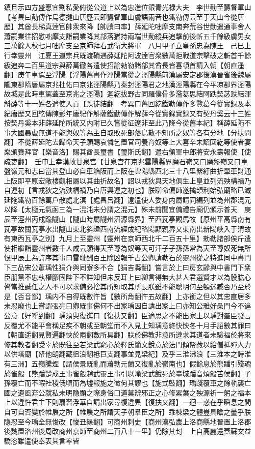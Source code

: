 鎮且示四方盛悳宜割私愛俯從公道上以為忠進位銀青光禄大夫　李世勣至欝督軍山　【考異曰勣傳作烏德揵山唐歷云即欝督軍山虜語兩音也鐵勒傳云至于天山今從唐歷】其酋長梯真逹官帥衆來降【帥讀曰率】薛延陀咄摩支南奔荒谷世勣遣通事舍人蕭嗣業往招慰咄摩支詣嗣業降其部落猶持兩端世勣縱兵追擊前後斬五千餘級虜男女三萬餘人秋七月咄摩支至京師拜右武衛大將軍　八月甲子立皇孫忠為陳王　己巳上行幸靈州　江夏王道宗兵既渡磧遇薛延陀阿波逹官衆數萬拒戰道宗擊破之斬首千餘級追奔二百里道宗與薛萬徹各遣使招諭勑勒諸部其酋長皆喜頓首請入朝【朝直遥翻】庚午車駕至浮陽【浮陽舊書作涇陽當從之涇陽縣前漢屬安定郡後漢晉省後魏屬隴東郡隋唐屬京兆杜佑曰京兆涇陽縣乃秦封涇陽君之地漢涇陽縣在今平凉郡界涇陽故城是此時車駕蓋至京兆之涇陽】迴紇拔野古同羅僕骨多濫葛思結阿跌契苾跌結渾斛薛等十一姓各遣使入貢【跌徒結翻　考異曰舊回紇鐵勒傳作多覽葛今從實録及本紀唐歷又回紇傳陳彭年唐紀作斛薩鐵勤傳作解薛今從實録實録又有契丹奚云十三姓按契丹奚本非薛延陀所統又内附已久嘗從征遼非至此乃降今從舊本紀】稱薛延陁不事大國暴虐無道不能與奴等為主自取敗死部落鳥散不知所之奴等各有分地【分扶問翻】不從薛延陀去歸命天子願賜哀憐乞置官司養育奴等上大喜辛未詔回紇等使者宴樂頒賚拜官【樂音洛】賜其酋長璽書【璽斯氏翻】遣右領軍中郎將安永壽報使【使疏吏翻】　壬申上幸漢故甘泉宫【甘泉宫在京兆雲陽縣界磨石嶺又曰磨盤嶺又曰車盤嶺元和志曰當其登山必自車箱阪而上阪在雲陽縣西北三十八里縈紆曲折單車財通上阪即平原宏敞樓觀相屬以其曲折故名】詔以戎狄與天地俱生上皇並列流殃構禍乃自運初【言戎狄之流殃構禍乃自唐興運之初也】朕聊命偏師遂擒頡利始弘廟略已滅延陁鐵勒百餘萬戶散處北溟【處昌呂翻】遠遣使人委身内屬請同編列並為州郡混元以降【太極元氣函三為一混沌未分謂之混元】殊未前聞宜備禮告廟仍頒示普天　庚辰至涇州丙戍踰隴山【隴山時屬隴州汧源縣界】至西瓦亭觀馬牧【原州平高縣南有瓦亭故關瓦亭水出隴山東北斜趣西南流經成紀略陽顯親界又東南出新陽峽入于渭故有東西瓦亭之别】九月上至靈州【靈州在京師西北千二百五十里】勑勒諸部俟斤遣使相繼詣靈州者數千人咸云願得天至尊為奴等天可汗子子孫孫常為天至尊奴死無所恨甲辰上為詩序其事曰雪耻酬百王除凶報千古公卿請勒石於靈州從之特進同中書門下三品宋公蕭瑀性狷介與同寮多不合【狷吉縣翻】嘗言於上曰房玄齡與中書門下衆臣朋黨不忠執權膠固陛下不詳知但未反耳上曰卿言得無大甚人君選賢才以為股肱心膂當推誠任之人不可以求備必捨其所短取其所長朕雖不能聰明何至頓迷臧否乃至於是【否音鄙】瑀内不自得既數忤旨【數所角翻忤五故翻】上亦銜之但以其忠直居多未忍廢也上嘗謂張亮曰卿既事佛何不出家瑀因自請出家上曰亦知公雅好桑門今不違公意【好呼到翻】瑀須臾復進曰【復扶又翻】臣適思之不能出家上以瑀對羣臣發言反覆尤不能平會稱足疾不朝或至朝堂而不入見上知瑀意終快怏冬十月手詔數其罪曰【朝直遥翻見賢遍翻怏於兩翻數所具翻】朕於佛教非意所遵求其道者未驗福於將來修其教者翻受辜於既往至若梁武窮心於釋氏簡文銳意於法門傾帑藏以給僧袛殫人力以供塔廟【帑他朗翻藏徂浪翻袛巨支翻事並見梁紀】及乎三淮沸浪【三淮本之詩淮有三洲】五嶺騰煙【謂侯景既亂而蕭勃元蘭又復亂於嶺南也】假餘息於熊蹯引殘魂於雀鷇【熊蹯楚成王事雀鷇趙武靈王事引以喻梁武餓死於臺城蹯音煩鷇苦侯翻】子孫覆亡而不暇社稷俄頃而為墟報施之徵何其謬也【施式豉翻】瑀踐覆車之餘軌襲亡國之遺風弃公就私未明隐顯之際身俗口道莫辨邪正之心修累葉之殃源祈一躬之福本上以違忤君主下則扇習浮華自請出家尋復違異【復扶又翻】一迴一惑在乎瞬息之間自可自否變於帷扆之所【帷扆之所謂天子朝羣臣之所】乖棟梁之體豈具曕之量乎朕隐忍至今瑀全無悛改【悛丑緣翻】可商州刺史【商州漢弘農上洛商縣地晉置上洛郡後魏置洛州後周改商州京師至商州二百八十一里】仍除其封　上自高麗還蓋蘇文益驕恣雖遣使奉表其言率皆